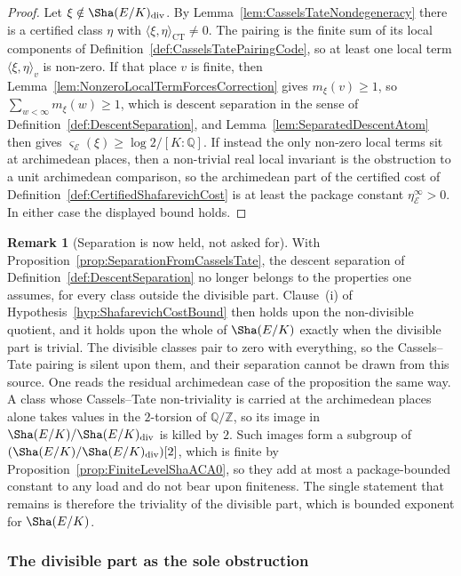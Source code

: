 \documentclass[10pt, reqno]{amsart}
\theoremstyle{plain}
\theoremstyle{definition}
\newtheorem{remark}[theorem]{Remark}
\theoremstyle{plain}
\newcommand{\Q}{\mathbb{Q}}
\newcommand{\Z}{\mathbb{Z}}
\begin{document}
\begin{proof}
Let $\xi\notin\Sha(E/K)_{\mathrm{div}}$. By Lemma~\ref{lem:CasselsTateNondegeneracy} there is a certified class $\eta$ with $\langle\xi,\eta\rangle_{\mathrm{CT}}\neq 0$. The pairing is the finite sum of its local components of Definition~\ref{def:CasselsTatePairingCode}, so at least one local term $\langle\xi,\eta\rangle_{v}$ is non-zero. If that place $v$ is finite, then Lemma~\ref{lem:NonzeroLocalTermForcesCorrection} gives $m_{\xi}(v)\ge 1$, so $\sum_{w<\infty}m_{\xi}(w)\ge 1$, which is descent separation in the sense of Definition~\ref{def:DescentSeparation}, and Lemma~\ref{lem:SeparatedDescentAtom} then gives $\varsigma_{\mathcal{E}}(\xi)\ge\log 2/[K:\Q]$. If instead the only non-zero local terms sit at archimedean places, then a non-trivial real local invariant is the obstruction to a unit archimedean comparison, so the archimedean part of the certified cost of Definition~\ref{def:CertifiedShafarevichCost} is at least the package constant $\eta^{\infty}_{\mathcal{E}}>0$. In either case the displayed bound holds.
\end{proof}

\begin{remark}[Separation is now held, not asked for]
\label{rem:SeparationPossessed}
With Proposition~\ref{prop:SeparationFromCasselsTate}, the descent separation of Definition~\ref{def:DescentSeparation} no longer belongs to the properties one assumes, for every class outside the divisible part. Clause~\textup{(i)} of Hypothesis~\ref{hyp:ShafarevichCostBound} then holds upon the non-divisible quotient, and it holds upon the whole of $\Sha(E/K)$ exactly when the divisible part is trivial. The divisible classes pair to zero with everything, so the Cassels--Tate pairing is silent upon them, and their separation cannot be drawn from this source. One reads the residual archimedean case of the proposition the same way. A class whose Cassels--Tate non-triviality is carried at the archimedean places alone takes values in the $2$-torsion of $\Q/\Z$, so its image in $\Sha(E/K)/\Sha(E/K)_{\mathrm{div}}$ is killed by $2$. Such images form a subgroup of $(\Sha(E/K)/\Sha(E/K)_{\mathrm{div}})[2]$, which is finite by Proposition~\ref{prop:FiniteLevelShaACA0}, so they add at most a package-bounded constant to any load and do not bear upon finiteness. The single statement that remains is therefore the triviality of the divisible part, which is bounded exponent for $\Sha(E/K)$.
\end{remark}

\subsubsection{The divisible part as the sole obstruction}
\label{subsubsec:DivisiblePartObstruction}
\end{document}
